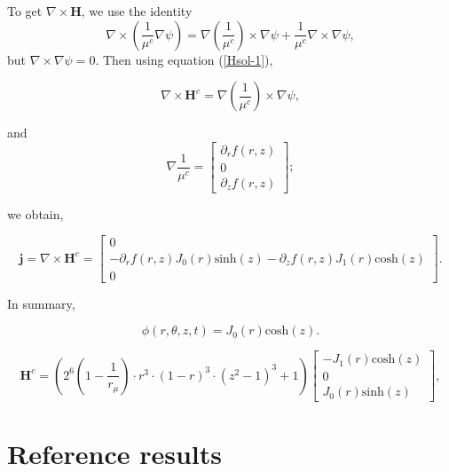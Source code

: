 \documentclass{book}
\begin{document}
\noindent To get $\nabla \times \mathbf{H}$, we use the identity 
$$
\nabla \times \left (\frac{1}{{\mu}^c} \nabla \psi \right )= \nabla \left ( \frac{1}{{\mu}^c} \right ) \times  \nabla
\psi + \frac{1}{{\mu}^c} \nabla \times  \nabla \psi,
$$
but $\nabla \times  \nabla \psi = 0$. Then  using  equation (\ref{Hsol-1}), 

\begin{equation*}
\nabla \times \mathbf{H}^c=\nabla \left ( \frac{1}{{\mu}^c} \right ) \times  \nabla \psi, 
\end{equation*}

\noindent and 
\begin{equation}
 \nabla  \frac{1}{{\mu}^c}  =\left[ \begin{array}{c} \partial _r f(r,z) \\ 0  \\ \partial _z f(r,z) \end{array} \right];
\end{equation}

\noindent we obtain,

\begin{equation}
\mathbf{j} = \nabla \times \mathbf{H}^c=
\left[ \begin{array}{c}
0 \\ 
-\partial _r f(r,z) J_0(r)   \text{sinh}(z)  
-\partial _z f(r,z) J_1(r)    \text{cosh}(z) \\
 0
\end{array} \right].
\end{equation}

\noindent In summary,


\begin{equation}
\label{psi-sol1}
\phi(r,\theta,z,t)=J_0(r)\text{cosh}(z).
\end{equation}

\begin{equation}
\mathbf{H}^c= 
\left ( 2^6\left (1- \frac{1}{r_{\mu}}\right)\cdot r^3 \cdot (1-r)^3 \cdot (z^2-1)^3 +1\right)
\left[ \begin{array}{c}
 -J_1 (r)  \text{cosh}(z) \\ 0 \\J_0 (r)  \text{sinh}(z) 
\end{array} \right],
\end{equation}


\section{Reference results}
\end{document}
